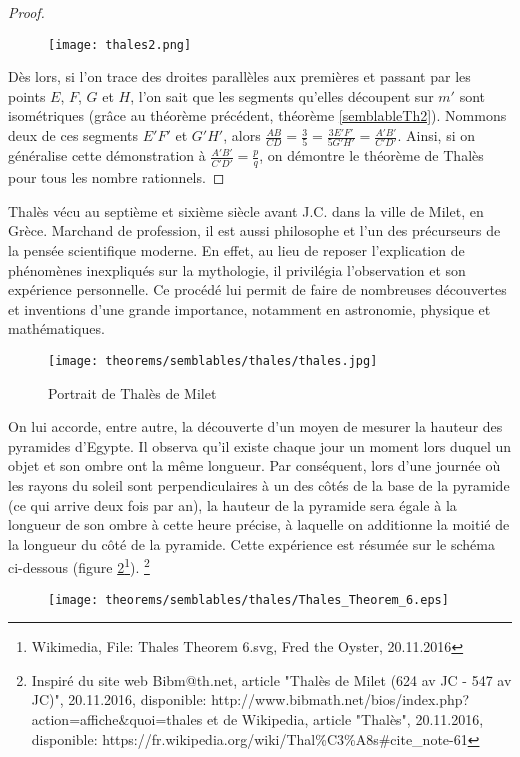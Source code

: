 \documentclass[a4paper,12pt]{article}
\begin{document}
\begin{proof}
\begin{figure}[H]
        \centering
        \texttt{[image: thales2.png]}
    \end{figure}

 Dès lors, si l'on trace des droites parallèles aux premières et passant par les points $E$, $F$, $G$ et $H$, l'on sait que les segments qu'elles découpent sur $m'$ sont isométriques (grâce au théorème précédent, théorème \ref{semblableTh2}). Nommons deux de ces segments $E'F'$ et $G'H'$, alors $\frac{AB}{CD} = \frac{3}{5} = \frac{3E'F'}{5G'H'} = \frac{A'B'}{C'D'}$.
Ainsi, si on généralise cette démonstration à $\frac{A'B'}{C'D'} = \frac{p}{q}$, on démontre le théorème de Thalès pour tous les nombre rationnels.
\end{proof}




\pagebreak
\begin{remark}
Thalès vécu au septième et sixième siècle avant J.C. dans la ville de Milet, en Grèce. Marchand de profession, il est aussi philosophe et l'un des précurseurs de la pensée scientifique moderne. En effet, au lieu de reposer l'explication de phénomènes inexpliqués sur la mythologie, il privilégia l'observation et son expérience personnelle. Ce procédé lui permit de faire de nombreuses découvertes et inventions d'une grande importance, notamment en astronomie, physique et mathématiques.\\
\begin{figure}[H]
    \centering
    \texttt{[image: theorems/semblables/thales/thales.jpg]}
    
    \caption{Portrait de Thalès de Milet}
    \label{fig:thales}
\end{figure}


On lui accorde, entre autre, la découverte d'un moyen de mesurer la hauteur des pyramides d'Egypte. Il observa qu'il existe chaque jour un moment lors duquel un objet et son ombre ont la même longueur. Par conséquent, lors d'une journée où les rayons du soleil sont perpendiculaires à un des côtés de la base de la pyramide (ce qui arrive deux fois par an), la hauteur de la pyramide sera égale à la longueur de son ombre à cette heure précise, à laquelle on additionne la moitié de la longueur du côté de la pyramide. Cette expérience est résumée sur le schéma ci-dessous (figure \ref{fig:exp}\footnote{Wikimedia, File: Thales Theorem 6.svg, Fred the Oyster, 20.11.2016}).
\footnote{Inspiré du site web Bibm@th.net, article "Thalès de Milet (624 av JC - 547 av JC)", 20.11.2016, disponible:
http://www.bibmath.net/bios/index.php?action=affiche\&quoi=thales et de Wikipedia, article "Thalès", 20.11.2016, disponible: https://fr.wikipedia.org/wiki/Thal\%C3\%A8s\#cite\_note-61}


\begin{figure}[H]
    \centering
    \texttt{[image: theorems/semblables/thales/Thales\_Theorem\_6.eps]}
    
    \caption{}
    \label{fig:exp}
\end{figure}
\end{remark}
\end{document}
